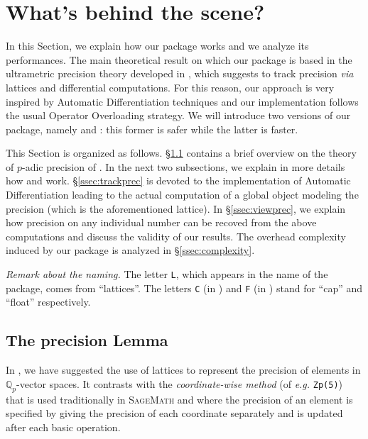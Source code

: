 \documentclass[sigconf]{acmart}
\newcommand{\Q}{\mathbb Q}
\newcommand{\Qp}{\Q_p}
\newcommand{\sage}{\textsc{SageMath}\xspace}
\newcommand{\ZpL}{\text{\color{output} \rm \tt ZpL}\xspace}
\newcommand{\ZpLC}{\text{\color{output} \rm \tt ZpLC}\xspace}
\newcommand{\ZpLF}{\text{\color{output} \rm \tt ZpLF}\xspace}
\theoremstyle{definition}
\begin{document}
\section{What's behind the scene?}

In this Section, we explain how our package \ZpL works and we analyze
its performances.
The main theoretical result on which our package is based in the 
ultrametric precision theory developed in \cite{caruso-roe-vaccon:14a}, which 
suggests to track precision \emph{via} lattices and differential 
computations. For this reason, our approach is very inspired by 
Automatic Differentiation techniques \cite{rall:1981} and our implementation 
follows the usual Operator Overloading strategy.
We will introduce two versions of our package, namely \ZpLC and \ZpLF: 
this former is safer while the latter is faster.

This Section is organized as follows.
\S \ref{ssec:preclemma} contains a brief overview on the theory of
$p$-adic precision of \cite{caruso-roe-vaccon:14a}. 
In the next two subsections, we explain in more details how \ZpLC and 
\ZpLF work. \S \ref{ssec:trackprec} is devoted to the implementation of 
Automatic Differentiation leading to the actual computation of a
global object modeling the precision (which is the aforementioned 
lattice). 
In \S \ref{ssec:viewprec}, we explain how precision on any individual number
can be recoved from the above computations and discuss the validity
of our results.
The overhead complexity induced by our package is analyzed in
\S \ref{ssec:complexity}.

\smallskip

\noindent \textit{Remark about the naming.}
%
The letter \texttt{L}, which appears in the name of the package, 
comes from ``lattices''. The letters \texttt{C} (in \ZpLC) and 
\texttt{F} (in \ZpLF) stand for ``cap'' and ``float'' respectively.

\subsection{The precision Lemma}
\label{ssec:preclemma}

In \cite{caruso-roe-vaccon:14a}, we have suggested the 
use of lattices to represent the precision of elements in 
$\Qp$-vector spaces.  It contrasts with the
\emph{coordinate-wise method} (of \textit{e.g.}
 \verb?Zp(5)?) that is used traditionally in \sage and
where the precision of an element is specified by giving the precision
of each coordinate separately and is updated after each basic
operation.
\end{document}
